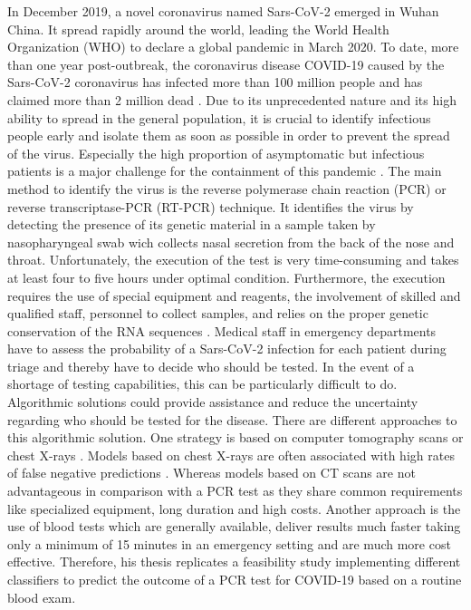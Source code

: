 In December 2019, a novel coronavirus named Sars-CoV-2 emerged in Wuhan China. 
It spread rapidly around the world, leading the World Health Organization (WHO) 
to declare a global pandemic in March 2020. To date, more than one year 
post-outbreak, the coronavirus disease COVID-19 caused by the Sars-CoV-2 
coronavirus has infected more than 100 million people and has claimed more than 
2 million dead \cite{RN204}. Due to its unprecedented nature and its high 
ability to spread in the general population, it is crucial to identify 
infectious people early and isolate them as soon as possible in order to 
prevent the spread of the virus. Especially the high proportion of asymptomatic 
but infectious patients is a major challenge for the containment of this 
pandemic \cite{RN205}. The main method to identify the virus is the reverse 
polymerase chain reaction (PCR) or reverse transcriptase-PCR (RT-PCR) 
technique. It identifies the virus by detecting the presence of its genetic 
material in a sample taken by nasopharyngeal swab wich collects nasal 
secretion from the back of the nose and throat. Unfortunately, the execution of 
the test is very time-consuming and takes at least four to five hours under 
optimal condition. 
Furthermore, the execution requires the use of special equipment and reagents, 
the involvement of skilled and qualified staff, personnel to collect samples, 
and relies on the proper genetic conservation of the RNA sequences 
\cite{RN201, RN202}.
Medical staff in emergency departments have to assess the probability of a 
Sars-CoV-2 infection for each patient during triage and thereby have to decide 
who should be tested. In the event of a shortage of testing capabilities, this 
can be particularly difficult to do. Algorithmic solutions could provide 
assistance and reduce the uncertainty regarding who should be tested for the 
disease. There are different approaches to this algorithmic solution.
One strategy is based on computer tomography scans or chest X-rays 
\cite{RN200}. Models based on chest X-rays are often associated with high rates 
of false negative predictions \cite{RN200, RN206}. Whereas models based on CT 
scans are not advantageous in comparison with a PCR test as they share common 
requirements like specialized equipment, long duration and high costs.
Another approach is the use of blood tests which are generally available, 
deliver results much faster taking only a minimum of 15 minutes in an emergency 
setting and are much more cost effective.
Therefore, his thesis replicates a feasibility study implementing different 
classifiers to predict the outcome of a PCR test for COVID-19 based on a 
routine blood exam.
